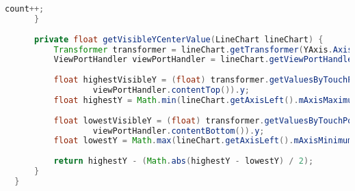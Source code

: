\documentclass[dvipdfmx,autodetect-engine,titlepage]{jsarticle}
\begin{document}
\begin{lstlisting}[language=java]
          count++;
      }
      
      private float getVisibleYCenterValue(LineChart lineChart) {
          Transformer transformer = lineChart.getTransformer(YAxis.AxisDependency.LEFT);
          ViewPortHandler viewPortHandler = lineChart.getViewPortHandler();
  
          float highestVisibleY = (float) transformer.getValuesByTouchPoint(viewPortHandler.contentLeft(),
                  viewPortHandler.contentTop()).y;
          float highestY = Math.min(lineChart.getAxisLeft().mAxisMaximum, highestVisibleY);
  
          float lowestVisibleY = (float) transformer.getValuesByTouchPoint(viewPortHandler.contentLeft(),
                  viewPortHandler.contentBottom()).y;
          float lowestY = Math.max(lineChart.getAxisLeft().mAxisMinimum, lowestVisibleY);
  
          return highestY - (Math.abs(highestY - lowestY) / 2);
      }
  }
  
\end{lstlisting}
\end{document}
